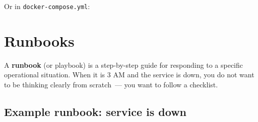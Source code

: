 \noindent{}Or in \texttt{docker-compose.yml}:

\begin{codebox}[short]

\begin{Shaded}
\begin{Highlighting}[]
\KeywordTok{:}
\AttributeTok{  }\KeywordTok{:}
\AttributeTok{    }\KeywordTok{:}
\end{Highlighting}
\end{Shaded}

\end{codebox}

\setcounter{section}{8}
\section{Runbooks}\label{37-reliability:379-runbooks}

A \textbf{runbook} (or playbook) is a step-by-step guide for responding to a specific operational situation. When it is 3 AM and the service is down, you do not want to be thinking clearly from scratch~--- you want to follow a checklist.

\subsection*{Example runbook: service is down}\label{37-reliability:example-runbook-service-is-down}

